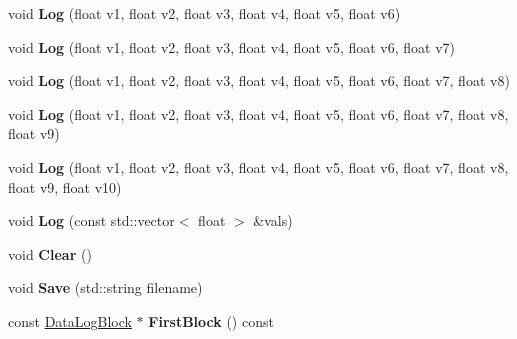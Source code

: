 \begin{DoxyCompactItemize}
\item 
void {\bfseries Log} (float v1, float v2, float v3, float v4, float v5, float v6)\hypertarget{classpangolin_1_1_data_log_af777f6a6ad712a2c661fc46dc5116134}{}\label{classpangolin_1_1_data_log_af777f6a6ad712a2c661fc46dc5116134}

\item 
void {\bfseries Log} (float v1, float v2, float v3, float v4, float v5, float v6, float v7)\hypertarget{classpangolin_1_1_data_log_a7911073c03725fe4e16210cd9dc1a7f7}{}\label{classpangolin_1_1_data_log_a7911073c03725fe4e16210cd9dc1a7f7}

\item 
void {\bfseries Log} (float v1, float v2, float v3, float v4, float v5, float v6, float v7, float v8)\hypertarget{classpangolin_1_1_data_log_aeb93b51a7205c3e9075932e8bb085520}{}\label{classpangolin_1_1_data_log_aeb93b51a7205c3e9075932e8bb085520}

\item 
void {\bfseries Log} (float v1, float v2, float v3, float v4, float v5, float v6, float v7, float v8, float v9)\hypertarget{classpangolin_1_1_data_log_afd4d65ada2542407964fcb5546127eb0}{}\label{classpangolin_1_1_data_log_afd4d65ada2542407964fcb5546127eb0}

\item 
void {\bfseries Log} (float v1, float v2, float v3, float v4, float v5, float v6, float v7, float v8, float v9, float v10)\hypertarget{classpangolin_1_1_data_log_aa4e904fcf838d2d1985eafcd5b34dd9a}{}\label{classpangolin_1_1_data_log_aa4e904fcf838d2d1985eafcd5b34dd9a}

\item 
void {\bfseries Log} (const std\+::vector$<$ float $>$ \&vals)\hypertarget{classpangolin_1_1_data_log_a93f2055a18e59137d36d662e96436565}{}\label{classpangolin_1_1_data_log_a93f2055a18e59137d36d662e96436565}

\item 
void {\bfseries Clear} ()\hypertarget{classpangolin_1_1_data_log_a6c7507f95ee9f73a266ea1ffa4aaecbb}{}\label{classpangolin_1_1_data_log_a6c7507f95ee9f73a266ea1ffa4aaecbb}

\item 
void {\bfseries Save} (std\+::string filename)\hypertarget{classpangolin_1_1_data_log_ade4c0071631ef20172906a50279026a2}{}\label{classpangolin_1_1_data_log_ade4c0071631ef20172906a50279026a2}

\item 
const \hyperlink{classpangolin_1_1_data_log_block}{Data\+Log\+Block} $\ast$ {\bfseries First\+Block} () const \hypertarget{classpangolin_1_1_data_log_a8304ddf3c98448431798a12521c6c690}{}\label{classpangolin_1_1_data_log_a8304ddf3c98448431798a12521c6c690}


\end{DoxyCompactItemize}
